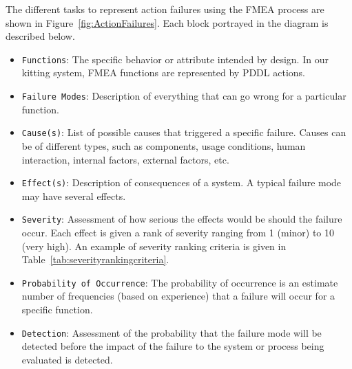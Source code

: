 The different tasks to represent action failures using the FMEA process are shown in Figure~\ref{fig:ActionFailures}. Each block portrayed in the diagram is described below.

 \begin{itemize}
   \item \texttt{Functions}: The specific behavior or attribute intended by design. In our kitting system, FMEA functions are represented by PDDL actions.
   \item \texttt{Failure Modes}: Description of everything that can go wrong for a particular function.
   \item \texttt{Cause(s)}: List of possible causes that triggered a specific failure. Causes can be of different types, such as  components, usage conditions, human interaction, internal factors, external factors, etc.
   \item \texttt{Effect(s)}: Description of consequences of a system. A typical failure mode may have several effects.
   \item \texttt{Severity}: Assessment of how serious the effects would be should the failure occur. Each effect is given a rank of severity ranging from 1 (minor) to 10 (very high). An example of severity ranking criteria is given in Table~\ref{tab:severityrankingcriteria}.
   \item \texttt{Probability of Occurrence}: The probability of occurrence is an estimate number of frequencies (based on experience) that a failure will occur for a specific function.
   \item \texttt{Detection}: Assessment of the probability that the failure mode will be detected before the impact
of the failure to the system or process being evaluated is detected.
 \end{itemize}

